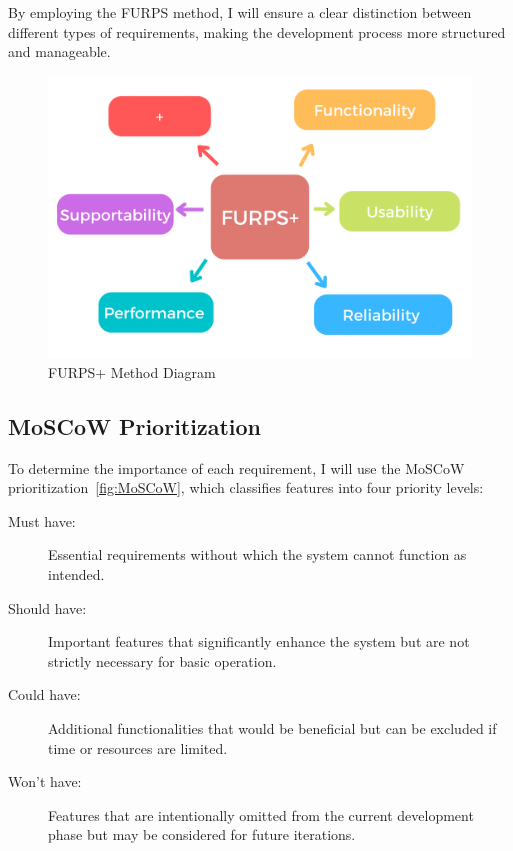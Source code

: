 By employing the FURPS method, I will ensure a clear distinction between different types of requirements, making the development process more structured and manageable.

\begin{figure}[!htbp]
  \centering
  \includegraphics[width=\linewidth]{images/furps}
  \caption{FURPS+ Method Diagram~\cite{FURPS}}
  \label{fig:FURPS}
\end{figure}

\subsection{MoSCoW Prioritization}

To determine the importance of each requirement, I will use the MoSCoW prioritization~\ref{fig:MoSCoW}, which classifies features into four priority levels:

\begin{description}
  \item [Must have:] Essential requirements without which the system cannot function as intended.
  \item [Should have:] Important features that significantly enhance the system but are not strictly necessary for basic operation.
  \item [Could have:] Additional functionalities that would be beneficial but can be excluded if time or resources are limited.
  \item [Won’t have:] Features that are intentionally omitted from the current development phase but may be considered for future iterations.
\end{description}

